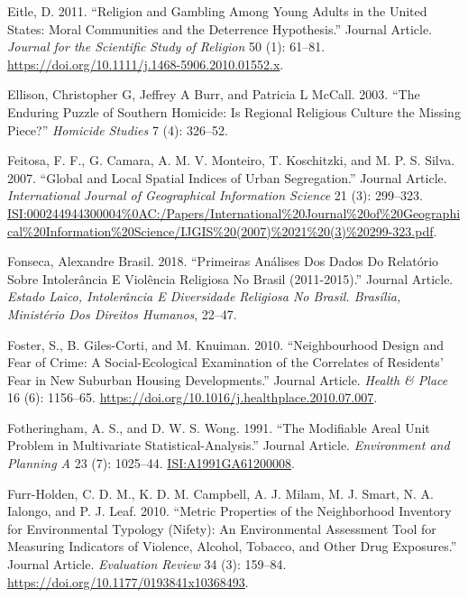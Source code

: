 \documentclass[smallextended]{svjour3}       %
\begin{document}
\leavevmode\hypertarget{ref-Eitle2011religion}{}%
Eitle, D. 2011. ``Religion and Gambling Among Young Adults in the United
States: Moral Communities and the Deterrence Hypothesis.'' Journal
Article. \emph{Journal for the Scientific Study of Religion} 50 (1):
61--81. \url{https://doi.org/10.1111/j.1468-5906.2010.01552.x}.

\leavevmode\hypertarget{ref-Ellison2003enduring}{}%
Ellison, Christopher G, Jeffrey A Burr, and Patricia L McCall. 2003.
``The Enduring Puzzle of Southern Homicide: Is Regional Religious
Culture the Missing Piece?'' \emph{Homicide Studies} 7 (4): 326--52.

\leavevmode\hypertarget{ref-Feitosa2007global}{}%
Feitosa, F. F., G. Camara, A. M. V. Monteiro, T. Koschitzki, and M. P.
S. Silva. 2007. ``Global and Local Spatial Indices of Urban
Segregation.'' Journal Article. \emph{International Journal of
Geographical Information Science} 21 (3): 299--323.
\url{ISI:000244944300004\%0AC:/Papers/International\%20Journal\%20of\%20Geographical\%20Information\%20Science/IJGIS\%20(2007)\%2021\%20(3)\%20299-323.pdf}.

\leavevmode\hypertarget{ref-Fonseca2018primeiras}{}%
Fonseca, Alexandre Brasil. 2018. ``Primeiras Análises Dos Dados Do
Relatório Sobre Intolerância E Violência Religiosa No Brasil
(2011-2015).'' Journal Article. \emph{Estado Laico, Intolerância E
Diversidade Religiosa No Brasil. Brasília, Ministério Dos Direitos
Humanos}, 22--47.

\leavevmode\hypertarget{ref-Foster2010neighbourhood}{}%
Foster, S., B. Giles-Corti, and M. Knuiman. 2010. ``Neighbourhood Design
and Fear of Crime: A Social-Ecological Examination of the Correlates of
Residents' Fear in New Suburban Housing Developments.'' Journal Article.
\emph{Health \& Place} 16 (6): 1156--65.
\url{https://doi.org/10.1016/j.healthplace.2010.07.007}.

\leavevmode\hypertarget{ref-Fotheringham1991modifiable}{}%
Fotheringham, A. S., and D. W. S. Wong. 1991. ``The Modifiable Areal
Unit Problem in Multivariate Statistical-Analysis.'' Journal Article.
\emph{Environment and Planning A} 23 (7): 1025--44.
\url{ISI:A1991GA61200008}.

\leavevmode\hypertarget{ref-Furr2010metric}{}%
Furr-Holden, C. D. M., K. D. M. Campbell, A. J. Milam, M. J. Smart, N.
A. Ialongo, and P. J. Leaf. 2010. ``Metric Properties of the
Neighborhood Inventory for Environmental Typology (Nifety): An
Environmental Assessment Tool for Measuring Indicators of Violence,
Alcohol, Tobacco, and Other Drug Exposures.'' Journal Article.
\emph{Evaluation Review} 34 (3): 159--84.
\url{https://doi.org/10.1177/0193841x10368493}.
\end{document}
